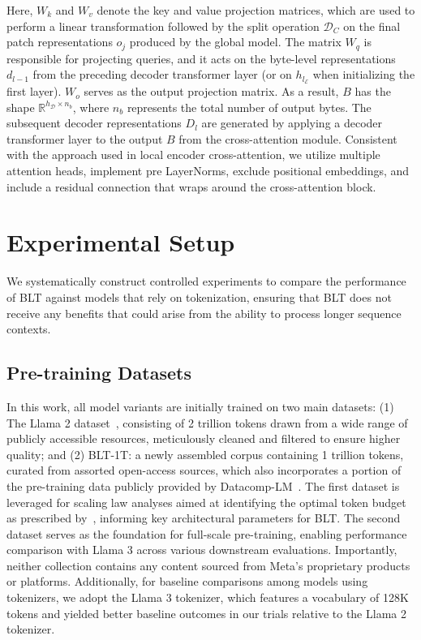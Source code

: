 Here, $W_k$ and $W_v$ denote the key and value projection matrices, which are used to perform a linear transformation followed by the split operation $\mathcal{D}_C$ on the final patch representations $o_j$ produced by the global model. The matrix $W_q$ is responsible for projecting queries, and it acts on the byte-level representations $d_{l-1}$ from the preceding decoder transformer layer (or on $h_{l_{\mathcal{E}}}$ when initializing the first layer). $W_o$ serves as the output projection matrix. As a result, $B$ has the shape $\mathbb{R}^{h_{\mathcal{D}} \times n_b}$, where $n_b$ represents the total number of output bytes. The subsequent decoder representations $D_l$ are generated by applying a decoder transformer layer to the output $B$ from the cross-attention module. Consistent with the approach used in local encoder cross-attention, we utilize multiple attention heads, implement pre LayerNorms, exclude positional embeddings, and include a residual connection that wraps around the cross-attention block.

\section{Experimental Setup}
\label{section:experiments}
We systematically construct controlled experiments to compare the performance of {\textsc BLT} against models that rely on tokenization, ensuring that {\textsc BLT} does not receive any benefits that could arise from the ability to process longer sequence contexts.

\subsection{Pre-training Datasets} In this work, all model variants are initially trained on two main datasets: (1) The Llama 2 dataset~\citep{touvron2023llama}, consisting of 2 trillion tokens drawn from a wide range of publicly accessible resources, meticulously cleaned and filtered to ensure higher quality; and (2) {\textsc BLT}-1T: a newly assembled corpus containing 1 trillion tokens, curated from assorted open-access sources, which also incorporates a portion of the pre-training data publicly provided by Datacomp-LM~\citep{li2024datacomp}. The first dataset is leveraged for scaling law analyses aimed at identifying the optimal token budget as prescribed by~\cite{dubey2024llama}, informing key architectural parameters for {\textsc BLT}. The second dataset serves as the foundation for full-scale pre-training, enabling performance comparison with Llama 3 across various downstream evaluations. Importantly, neither collection contains any content sourced from Meta’s proprietary products or platforms. Additionally, for baseline comparisons among models using tokenizers, we adopt the Llama 3 tokenizer, which features a vocabulary of 128K tokens and yielded better baseline outcomes in our trials relative to the Llama 2 tokenizer.


